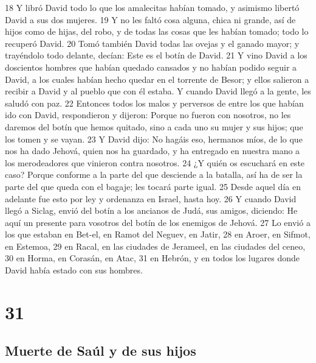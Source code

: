 {18 Y libró David todo lo que los amalecitas habían tomado, y asimismo libertó David a sus dos mujeres.
19 Y no les faltó cosa alguna, chica ni grande, así de hijos como de hijas, del robo, y de todas las cosas que les habían tomado; todo lo recuperó David.
20 Tomó también David todas las ovejas y el ganado mayor; y trayéndolo todo delante, decían: Este es el botín de David.
21 Y vino David a los doscientos hombres que habían quedado cansados y no habían podido seguir a David, a los cuales habían hecho quedar en el torrente de Besor; y ellos salieron a recibir a David y al pueblo que con él estaba. Y cuando David llegó a la gente, les saludó con paz.
22 Entonces todos los malos y perversos de entre los que habían ido con David, respondieron y dijeron: Porque no fueron con nosotros, no les daremos del botín que hemos quitado, sino a cada uno su mujer y sus hijos; que los tomen y se vayan.
23 Y David dijo: No hagáis eso, hermanos míos, de lo que nos ha dado Jehová, quien nos ha guardado, y ha entregado en nuestra mano a los merodeadores que vinieron contra nosotros.
24 ¿Y quién os escuchará en este caso? Porque conforme a la parte del que desciende a la batalla, así ha de ser la parte del que queda con el bagaje; les tocará parte igual.
25 Desde aquel día en adelante fue esto por ley y ordenanza en Israel, hasta hoy.
26 Y cuando David llegó a Siclag, envió del botín a los ancianos de Judá, sus amigos, diciendo: He aquí un presente para vosotros del botín de los enemigos de Jehová.
27 Lo envió a los que estaban en Bet-el, en Ramot del Neguev, en Jatir,
28 en Aroer, en Sifmot, en Estemoa,
29 en Racal, en las ciudades de Jerameel, en las ciudades del ceneo,
30 en Horma, en Corasán, en Atac,
31 en Hebrón, y en todos los lugares donde David había estado con sus hombres.

\chapter{31}

\section*{Muerte de Saúl y de sus hijos }

}
